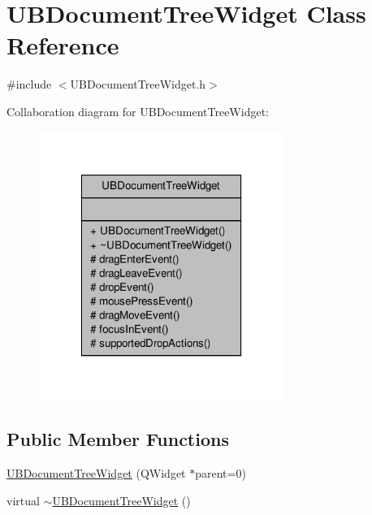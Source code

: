 \hypertarget{class_u_b_document_tree_widget}{\section{U\-B\-Document\-Tree\-Widget Class Reference}
\label{d1/df2/class_u_b_document_tree_widget}
}


{\ttfamily \#include $<$U\-B\-Document\-Tree\-Widget.\-h$>$}



Collaboration diagram for U\-B\-Document\-Tree\-Widget\-:
\nopagebreak
\begin{figure}[H]
\begin{center}
\leavevmode
\includegraphics[width=226pt]{dd/d66/class_u_b_document_tree_widget__coll__graph}
\end{center}
\end{figure}
\subsection*{Public Member Functions}
\begin{DoxyCompactItemize}
\item 
\hyperlink{class_u_b_document_tree_widget_a369cd0216b7f5a36e2c661a34fef7a91}{U\-B\-Document\-Tree\-Widget} (Q\-Widget $\ast$parent=0)
\item 
virtual \hyperlink{class_u_b_document_tree_widget_a59f5c6b1c7b93f2ced971e07d03c463c}{$\sim$\-U\-B\-Document\-Tree\-Widget} ()
\end{DoxyCompactItemize}
